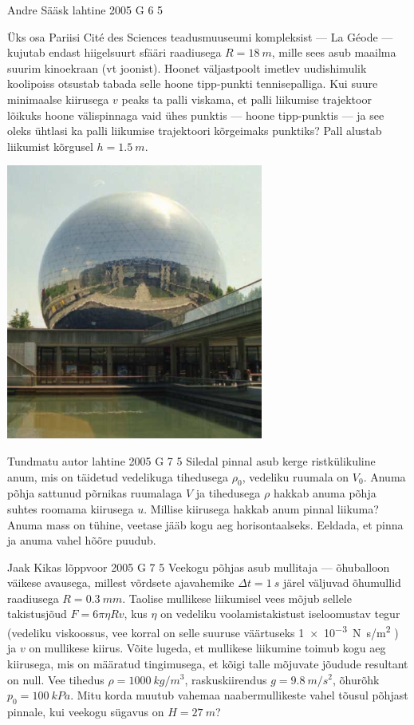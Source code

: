\documentclass[11pt]{article}
\begin{document}
{%
{Andre Sääsk} %
{lahtine} %
{2005} %
{G 6} %
{5} %
{
\ifStatement
Üks osa Pariisi Cité des Sciences teadusmuuseumi kompleksist --- La Géode --- kujutab endast hiigelsuurt sfääri raadiusega $R = \SI{18}{m}$, mille sees asub maailma suurim kinoekraan (vt joonist). Hoonet väljastpoolt imetlev uudishimulik koolipoiss otsustab tabada selle hoone tipp-punkti tennisepalliga. Kui suure minimaalse kiirusega $v$ peaks ta palli viskama, et palli liikumise trajektoor lõikuks hoone välispinnaga vaid ühes punktis --- hoone tipp-punktis --- ja see oleks ühtlasi ka palli liikumise trajektoori kõrgeimaks punktiks? Pall alustab liikumist kõrgusel $h = \SI{1,5}{m}$.

\begin{center}
	\includegraphics[width=0.5\linewidth]{2005-lahg-06-yl}
\end{center}
\fi
}

{Tundmatu autor} %
{lahtine} %
{2005} %
{G 7} %
{5} %
{
\ifStatement
Siledal pinnal asub kerge ristkülikuline anum, mis on täidetud vedelikuga tihedusega $\rho_0$, vedeliku ruumala on $V_0$. Anuma põhja sattunud põrnikas ruumalaga $V$ ja tihedusega $\rho$ hakkab anuma põhja suhtes roomama kiirusega $u$. Millise kiirusega hakkab anum pinnal liikuma? Anuma mass on tühine, veetase jääb kogu aeg horisontaalseks. Eeldada, et pinna ja anuma vahel hõõre puudub.
\fi
}

{Jaak Kikas} %
{lõppvoor} %
{2005} %
{G 7} %
{5} %
{
\ifStatement
Veekogu põhjas asub mullitaja --- õhuballoon väikese avausega, millest võrdsete ajavahemike $\Delta t = \SI{1}{s}$ järel väljuvad õhumullid raadiusega $R = \SI{0,3}{mm}$. Taolise mullikese liikumisel vees mõjub sellele takistusjõud $F = 6\pi \eta Rv$, kus $\eta$ on vedeliku voolamistakistust iseloomustav tegur (vedeliku viskoossus, vee korral on selle suuruse väärtuseks \SI{1e-3}{N.s/m^2} ) ja $v$ on mullikese kiirus. Võite lugeda, et mullikese liikumine toimub kogu aeg kiirusega, mis on määratud tingimusega, et kõigi talle mõjuvate jõudude resultant on null. Vee tihedus $\rho = \SI{1000}{kg/m^3}$, raskuskiirendus $g = \SI{9,8}{m/s^2}$, õhurõhk $p_0 = \SI{100}{kPa}$. Mitu korda muutub vahemaa naabermullikeste vahel tõusul põhjast pinnale, kui veekogu sügavus on $H = \SI{27}{m}$?
\fi
}

}
\end{document}
